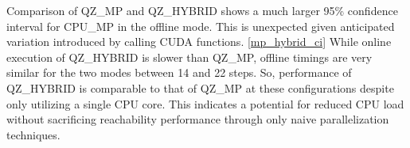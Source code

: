 \documentclass[runningheads]{llncs}
\begin{document}
Comparison of QZ\_MP and QZ\_HYBRID shows a much larger 95\% confidence interval for CPU\_MP  in the offline mode. This is unexpected given anticipated variation introduced by calling CUDA functions. \ref{mp_hybrid_ci} While online execution of QZ\_HYBRID is slower than QZ\_MP, offline timings are very similar for the two modes between 14 and 22 steps. So, performance of QZ\_HYBRID is comparable to that of QZ\_MP at these configurations despite only utilizing a single CPU core. This indicates a potential for reduced CPU load without sacrificing reachability performance through only naive parallelization techniques.


%
%
%


%
%
\end{document}
